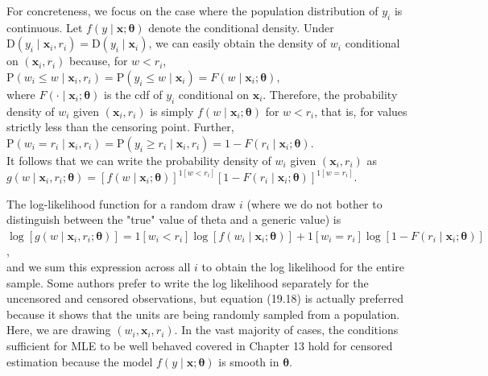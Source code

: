 \documentclass[10pt]{article}
\begin{document}
For concreteness, we focus on the case where the population distribution of $y_{i}$ is continuous. Let $f(y \mid \mathbf{x} ; \boldsymbol{\theta})$ denote the conditional density. Under $\mathrm{D}\left(y_{i} \mid \mathbf{x}_{i}, r_{i}\right)= \mathrm{D}\left(y_{i} \mid \mathbf{x}_{i}\right)$, we can easily obtain the density of $w_{i}$ conditional on $\left(\mathbf{x}_{i}, r_{i}\right)$ because, for $w<r_{i}$,\\
$\mathrm{P}\left(w_{i} \leq w \mid \mathbf{x}_{i}, r_{i}\right)=\mathrm{P}\left(y_{i} \leq w \mid \mathbf{x}_{i}\right)=F\left(w \mid \mathbf{x}_{i} ; \boldsymbol{\theta}\right)$,\\
where $F\left(\cdot \mid \mathbf{x}_{i} ; \boldsymbol{\theta}\right)$ is the cdf of $y_{i}$ conditional on $\mathbf{x}_{i}$. Therefore, the probability density of $w_{i}$ given $\left(\mathbf{x}_{i}, r_{i}\right)$ is simply $f\left(w \mid \mathbf{x}_{i} ; \boldsymbol{\theta}\right)$ for $w<r_{i}$, that is, for values strictly less than the censoring point. Further,\\
$\mathrm{P}\left(w_{i}=r_{i} \mid \mathbf{x}_{i}, r_{i}\right)=\mathrm{P}\left(y_{i} \geq r_{i} \mid \mathbf{x}_{i}, r_{i}\right)=1-F\left(r_{i} \mid \mathbf{x}_{i} ; \boldsymbol{\theta}\right)$.\\
It follows that we can write the probability density of $w_{i}$ given $\left(\mathbf{x}_{i}, r_{i}\right)$ as\\
$g\left(w \mid \mathbf{x}_{i}, r_{i} ; \boldsymbol{\theta}\right)=\left[f\left(w \mid \mathbf{x}_{i} ; \boldsymbol{\theta}\right)\right]^{1\left[w<r_{i}\right]}\left[1-F\left(r_{i} \mid \mathbf{x}_{i} ; \boldsymbol{\theta}\right)\right]^{1\left[w=r_{i}\right]}$.

The log-likelihood function for a random draw $i$ (where we do not bother to distinguish between the "true" value of theta and a generic value) is\\
$\log \left[g\left(w \mid \mathbf{x}_{i}, r_{i} ; \boldsymbol{\theta}\right)\right]=1\left[w_{i}<r_{i}\right] \log \left[f\left(w_{i} \mid \mathbf{x}_{i} ; \boldsymbol{\theta}\right)\right]+1\left[w_{i}=r_{i}\right] \log \left[1-F\left(r_{i} \mid \mathbf{x}_{i} ; \boldsymbol{\theta}\right)\right]$,\\
and we sum this expression across all $i$ to obtain the log likelihood for the entire sample. Some authors prefer to write the log likelihood separately for the uncensored and censored observations, but equation (19.18) is actually preferred because it shows that the units are being randomly sampled from a population. Here, we are drawing $\left(w_{i}, \mathbf{x}_{i}, r_{i}\right)$. In the vast majority of cases, the conditions sufficient for MLE to be well behaved covered in Chapter 13 hold for censored estimation because the model $f(y \mid \mathbf{x} ; \boldsymbol{\theta})$ is smooth in $\boldsymbol{\theta}$.
\end{document}
